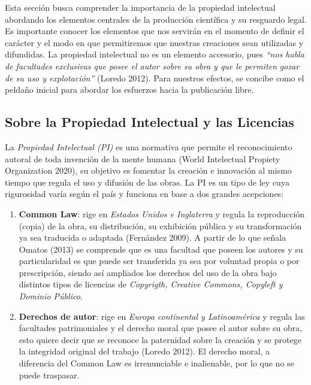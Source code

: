 \documentclass[
  spanish,
  letterpaper,
  DIV=11,
  numbers=noendperiod]{scrreprt}
\begin{document}
Esta sección busca comprender la importancia de la propiedad intelectual
abordando los elementos centrales de la producción científica y su
resguardo legal. Es importante conocer los elementos que nos servirán en
el momento de definir el carácter y el modo en que permitiremos que
nuestras creaciones sean utilizadas y difundidas. La propiedad
intelectual no es un elemento accesorio, pues \emph{``nos habla de
facultades exclusivas que posee el autor sobre su obra y que le permiten
gozar de su uso y explotación''} (Loredo 2012). Para nuestros efectos,
se concibe como el peldaño inicial para abordar los esfuerzos hacia la
publicación libre.

\subsection{Sobre la Propiedad Intelectual y las
Licencias}\label{sobre-la-propiedad-intelectual-y-las-licencias}

La \emph{Propiedad Intelectual (PI)} es una normativa que permite el
reconocimiento autoral de toda invención de la mente humana (World
Intelectual Propiety Organization 2020), su objetivo es fomentar la
creación e innovación al mismo tiempo que regula el uso y difusión de
las obras. La PI es un tipo de ley cuya rigurosidad varía según el país
y funciona en base a dos grandes acepciones:

\begin{enumerate}
\def\labelenumi{\arabic{enumi}.}
\item
  \textbf{Common Law}: rige en \emph{Estados Unidos e Inglaterra} y
  regula la reproducción (copia) de la obra, su distribución, su
  exhibición pública y su transformación ya sea traducida o adaptada
  (Fernández 2009). A partir de lo que señala Omatos (2013) se comprende
  que es una facultad que poseen los autores y su particularidad es que
  puede ser transferida ya sea por voluntad propia o por prescripción,
  siendo así ampliados los derechos del uso de la obra bajo distintos
  tipos de licencias de \emph{Copyrigth, Creative Commons, Copyleft y
  Dominio Público}.
\item
  \textbf{Derechos de autor}: rige en \emph{Europa continental y
  Latinoamérica} y regula las facultades patrimoniales y el derecho
  moral que posee el autor sobre su obra, esto quiere decir que se
  reconoce la paternidad sobre la creación y se protege la integridad
  original del trabajo (Loredo 2012). El derecho moral, a diferencia del
  Common Law es irrenunciable e inalienable, por lo que no se puede
  traspasar.
\end{enumerate}
\end{document}
